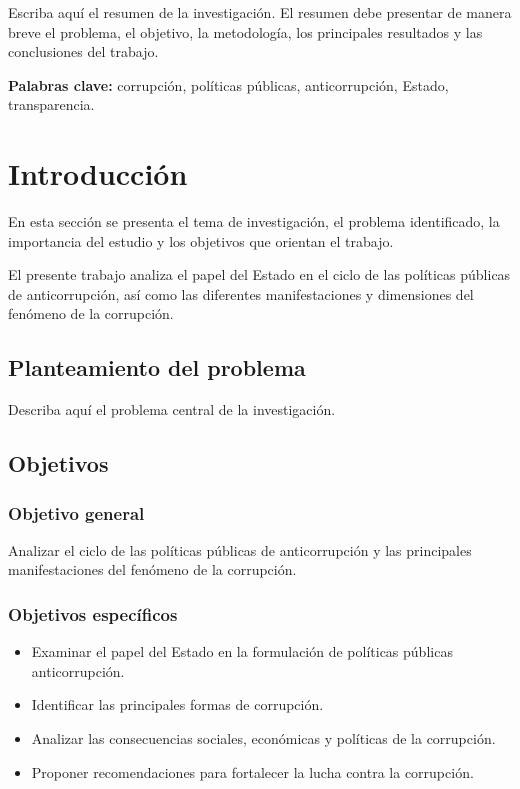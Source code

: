 \documentclass[12pt,a4paper]{article}
\begin{document}
Escriba aquí el resumen de la investigación. El resumen debe presentar de manera breve el problema, el objetivo, la metodología, los principales resultados y las conclusiones del trabajo.


\textbf{Palabras clave:} corrupción, políticas públicas, anticorrupción, Estado, transparencia.

\section{Introducción}

En esta sección se presenta el tema de investigación, el problema identificado, la importancia del estudio y los objetivos que orientan el trabajo.

El presente trabajo analiza el papel del Estado en el ciclo de las políticas públicas de anticorrupción, así como las diferentes manifestaciones y dimensiones del fenómeno de la corrupción.

\subsection{Planteamiento del problema}

Describa aquí el problema central de la investigación.

\subsection{Objetivos}

\subsubsection{Objetivo general}

Analizar el ciclo de las políticas públicas de anticorrupción y las principales manifestaciones del fenómeno de la corrupción.

\subsubsection{Objetivos específicos}

\begin{itemize}
    \item Examinar el papel del Estado en la formulación de políticas públicas anticorrupción.
    \item Identificar las principales formas de corrupción.
    \item Analizar las consecuencias sociales, económicas y políticas de la corrupción.
    \item Proponer recomendaciones para fortalecer la lucha contra la corrupción.
\end{itemize}
\end{document}

